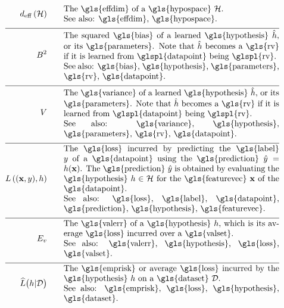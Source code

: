 \begin{align}
	\effdim{\hypospace}  \quad\quad & \parbox{.75\textwidth}{The \gls{effdim} of a \gls{hypospace} $\hypospace$.
		\\ See also: \gls{effdim}, \gls{hypospace}. }   \nonumber \\[2mm] \hline \nonumber\\[-5mm]
	\biasterm^2 \quad\quad &\parbox{.75\textwidth}{
		The squared \gls{bias} of a learned \gls{hypothesis} $\learnthypothesis$, or its \gls{parameters}. Note that $\learnthypothesis$ 
		becomes a \gls{rv} if it is learned from \glspl{datapoint} being \glspl{rv}.
		\\ See also: \gls{bias}, \gls{hypothesis}, \gls{parameters}, \gls{rv}, \gls{datapoint}. } \nonumber  \nonumber \\[2mm] \hline \nonumber\\[-5mm]
	\varianceterm \quad\quad &\parbox{.75\textwidth}{The \gls{variance} of a learned 
	  	\gls{hypothesis} $\learnthypothesis$, or its \gls{parameters}. Note that $\learnthypothesis$ 
	  	becomes a \gls{rv} if it is learned from \glspl{datapoint} being \glspl{rv}.
		\\ See also: \gls{variance}, \gls{hypothesis}, \gls{parameters}, \gls{rv}, \gls{datapoint}. } \nonumber \nonumber \\[2mm] \hline \nonumber\\[-5mm]
	\lossfunc{(\featurevec,\truelabel)}{\hypothesis}  \quad\quad & \parbox{.75\textwidth}{The \gls{loss} incurred by predicting the 
		\gls{label} $\truelabel$ of a \gls{datapoint} using the \gls{prediction} $\hat{\truelabel}=h(\featurevec)$. The 
		\gls{prediction} $\hat{\truelabel}$ is obtained by evaluating the \gls{hypothesis} $\hypothesis \in \hypospace$ for 
		the \gls{featurevec} $\featurevec$ of the \gls{datapoint}.
		\\ See also: \gls{loss}, \gls{label}, \gls{datapoint}, \gls{prediction}, \gls{hypothesis}, 
		\gls{featurevec}. }    \nonumber  \nonumber \\[2mm] \hline \nonumber\\[-5mm] 
	\valerror \quad\quad &\parbox{.75\textwidth}{The \gls{valerr} of a \gls{hypothesis} $\hypothesis$, which is its 
		average \gls{loss} incurred over a \gls{valset}.
		\\ See also: \gls{valerr}, \gls{hypothesis}, \gls{loss}, \gls{valset}. }  \nonumber \\[2mm] \hline \nonumber\\[-5mm]
	\emperror\big(\hypothesis| \dataset \big) \quad\quad &\parbox{.75\textwidth}{The \gls{emprisk} or average \gls{loss} 
		incurred by the \gls{hypothesis} $\hypothesis$ on a \gls{dataset} $\dataset$.
		\\ See also: \gls{emprisk}, \gls{loss}, \gls{hypothesis}, \gls{dataset}. } \nonumber 
\end{align}     

